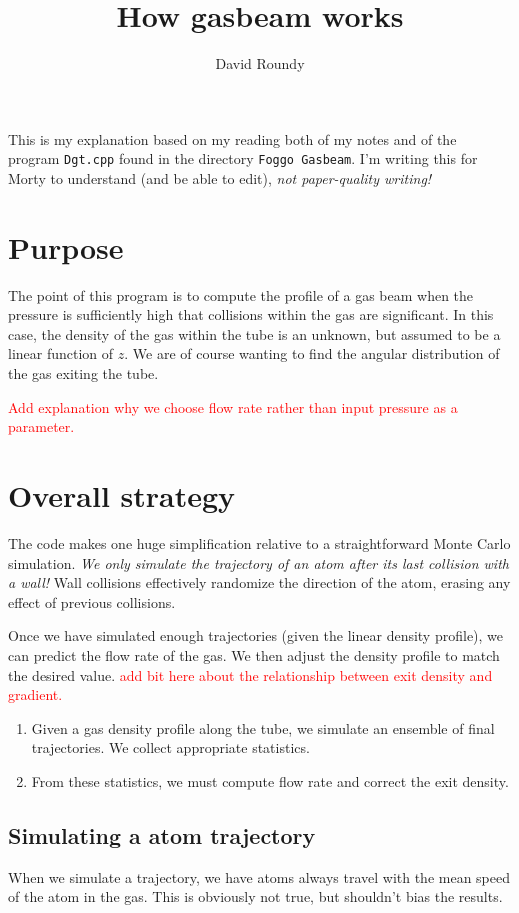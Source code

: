 \documentclass{article}
\title{How gasbeam works}
\author{David Roundy}
\newcommand\fixme[1]{\textcolor{red}{\sc #1}}
\begin{document}
\maketitle This is my explanation based on my reading both of my notes
and of the program \verb!Dgt.cpp! found in the directory
\verb!Foggo Gasbeam!.  I'm writing this for Morty to understand (and
be able to edit), \emph{not paper-quality writing!}

\section{Purpose}
The point of this program is to compute the profile of a gas beam when
the pressure is sufficiently high that collisions within the gas are
significant.  In this case, the density of the gas within the tube is
an unknown, but assumed to be a linear function of $z$.  We are of
course wanting to find the angular distribution of the gas exiting the
tube.

\fixme{Add explanation why we choose flow rate rather than input pressure as a parameter.}

\section{Overall strategy}
The code makes one huge simplification relative to a straightforward
Monte Carlo simulation.  \emph{We only simulate the trajectory of an
  atom after its last collision with a wall!} Wall collisions effectively randomize the direction of
the atom, erasing any effect of previous collisions.

Once we have simulated enough trajectories (given the linear density
profile), we can predict the flow rate of the gas.  We then adjust the
density profile to match the desired value.  \fixme{add bit here about the relationship between exit density and gradient.}
\begin{enumerate}
\item Given a gas density profile along the tube, we simulate an
  ensemble of final trajectories.  We collect appropriate statistics.
\item From these statistics, we must compute flow rate and correct the
  exit density.
\end{enumerate}

\subsection{Simulating a atom trajectory}
When we simulate a trajectory, we have atoms always travel with the
mean speed of the atom in the gas.  This is obviously not true, but
shouldn't bias the results.
\end{document}
